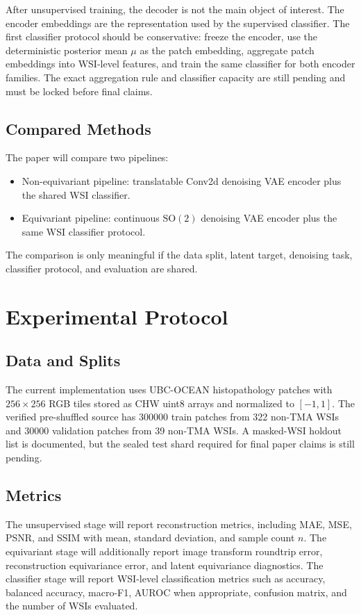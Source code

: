 \documentclass[conference]{IEEEtran}
\begin{document}
After unsupervised training, the decoder is not the main object of interest.
The encoder embeddings are the representation used by the supervised classifier.
The first classifier protocol should be conservative: freeze the encoder, use
the deterministic posterior mean $\mu$ as the patch embedding, aggregate patch
embeddings into WSI-level features, and train the same classifier for both
encoder families. The exact aggregation rule and classifier capacity are still
pending and must be locked before final claims.

\subsection{Compared Methods}

The paper will compare two pipelines:
\begin{itemize}
\item Non-equivariant pipeline: translatable Conv2d denoising VAE encoder plus
the shared WSI classifier.
\item Equivariant pipeline: continuous $\mathrm{SO}(2)$ denoising VAE encoder
plus the same WSI classifier protocol.
\end{itemize}
The comparison is only meaningful if the data split, latent target, denoising
task, classifier protocol, and evaluation are shared.

\section{Experimental Protocol}

\subsection{Data and Splits}

The current implementation uses UBC-OCEAN histopathology patches with
$256\times256$ RGB tiles stored as CHW uint8 arrays and normalized to
$[-1,1]$. The verified pre-shuffled source has 300000 train patches from 322
non-TMA WSIs and 30000 validation patches from 39 non-TMA WSIs. A masked-WSI
holdout list is documented, but the sealed test shard required for final paper
claims is still pending.

\subsection{Metrics}

The unsupervised stage will report reconstruction metrics, including MAE, MSE,
PSNR, and SSIM with mean, standard deviation, and sample count $n$. The
equivariant stage will additionally report image transform roundtrip error,
reconstruction equivariance error, and latent equivariance diagnostics. The
classifier stage will report WSI-level classification metrics such as accuracy,
balanced accuracy, macro-F1, AUROC when appropriate, confusion matrix, and the
number of WSIs evaluated.
\end{document}
